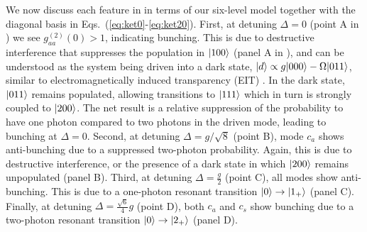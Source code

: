 



We now discuss each feature
in  in terms of our six-level
model together with the diagonal basis
in Eqs.~(\ref{eq:ket0}-\ref{eq:ket20}).
First, at 
detuning $\Delta = 0$ (point A in )
we see $g^{(2)}_{aa}(0)>1$, indicating bunching.  
This is due to destructive interference that
suppresses
the population in  $| 100 \rangle$ 
(panel A in ), and
can be understood as the system being
driven into a dark state,
$| d \rangle \propto g | 000 \rangle - \Omega | 011 \rangle$, similar to
electromagnetically induced 
transparency (EIT) \cite{Lukin2003, Weis2010}.
In the dark state, $| 011 \rangle$ remains populated,
allowing transitions to $| 111 \rangle$
which in turn is strongly coupled to
$| 200 \rangle$.
The net result is a relative 
suppression of the probability to have one photon
compared to two photons
in the driven mode, 
leading to bunching at $\Delta = 0$.
Second, at detuning $\Delta = g/\sqrt{8}$ 
(point B), 
mode $c_a$ shows anti-bunching
due to a suppressed two-photon probability.
Again, this is due to destructive interference, or
the presence of a dark state in which
$| 200 \rangle$ remains unpopulated
(panel B).
Third, at detuning $\Delta = \frac{g}{2}$ 
(point C), 
all  modes show anti-bunching.
This is due to
a one-photon  resonant transition
$| 0 \rangle \rightarrow | 1_+ \rangle$ 
(panel C).
Finally, at detuning $\Delta = \frac{\sqrt{6}}{4}g$ 
(point D), 
both $c_a$ and $c_s$ show bunching due
to a two-photon resonant transition
$| 0 \rangle \rightarrow | 2_+ \rangle$
(panel D).

